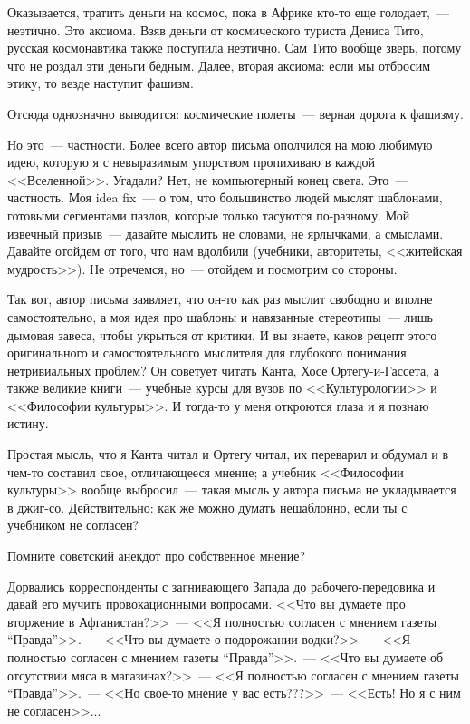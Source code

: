 \documentclass{scrbook}
\newcommand{\flqq}{<<}
\newcommand{\frqq}{>>}
\newcommand{\mdash}{~--- }
\newcommand{\commamdash}{~--- } %
\begin{document}
Оказывается, тратить деньги на космос, пока в Африке кто-то еще голодает,{\commamdash}неэтично. Это аксиома. Взяв деньги от космического туриста Дениса Тито, русская космонавтика также поступила неэтично. Сам Тито вообще зверь, потому что не роздал эти деньги бедным. Далее, вторая аксиома: если мы отбросим этику, то везде наступит фашизм.

Отсюда однозначно выводится: космические полеты{\mdash}верная дорога к фашизму.

Но это{\mdash}частности. Более всего автор письма ополчился на мою любимую идею, которую я с невыразимым упорством пропихиваю в каждой {\flqq}Вселенной{\frqq}. Угадали? Нет, не компьютерный конец света. Это{\mdash}частность. Моя idea fix{\mdash}о том, что большинство людей мыслят шаблонами, готовыми сегментами пазлов, которые только тасуются по-разному. Мой извечный призыв{\mdash}давайте мыслить не словами, не ярлычками, а смыслами. Давайте отойдем от того, что нам вдолбили (учебники, авторитеты, {\flqq}житейская мудрость{\frqq}). Не отречемся, но{\mdash}отойдем и посмотрим со стороны.

Так вот, автор письма заявляет, что он-то как раз мыслит свободно и вполне самостоятельно, а моя идея про шаблоны и навязанные стереотипы{\mdash}лишь дымовая завеса, чтобы укрыться от критики. И вы знаете, каков рецепт этого оригинального и самостоятельного мыслителя для глубокого понимания нетривиальных проблем? Он советует читать Канта, Хосе Ортегу-и-Гассета, а также великие книги{\mdash}учебные курсы для вузов по {\flqq}Культурологии{\frqq} и {\flqq}Философии культуры{\frqq}. И тогда-то у меня откроются глаза и я познаю истину.

Простая мысль, что я Канта читал и Ортегу читал, их переварил и обдумал и в чем-то составил свое, отличающееся мнение; а учебник {\flqq}Философии культуры{\frqq} вообще выбросил{\mdash}такая мысль у автора письма не укладывается в джиг-со. Действительно: как же можно думать нешаблонно, если ты с учебником не согласен?

Помните советский анекдот про собственное мнение?

Дорвались корреспонденты с загнивающего Запада до рабочего-передовика и давай его мучить провокационными вопросами. {\flqq}Что вы думаете про вторжение в Афганистан?{\frqq}{\mdash}{\flqq}Я полностью согласен с мнением газеты “Правда”{\frqq}.{\mdash} {\flqq}Что вы думаете о подорожании водки?{\frqq}{\mdash}{\flqq}Я полностью согласен с мнением газеты “Правда”{\frqq}.{\mdash} {\flqq}Что вы думаете об отсутствии мяса в магазинах?{\frqq}{\mdash}{\flqq}Я полностью согласен с мнением газеты “Правда”{\frqq}.{\mdash} {\flqq}Но свое-то мнение у вас есть???{\frqq}{\mdash}{\flqq}Есть! Но я с ним не согласен{\frqq}...
\end{document}
